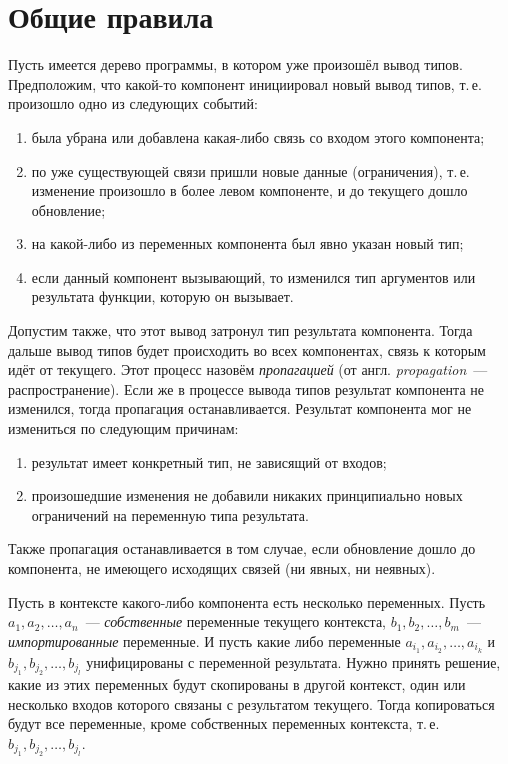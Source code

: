 \section{Общие правила}
Пусть имеется дерево программы, в котором уже произошёл вывод типов. Предположим, что какой-то компонент инициировал новый вывод типов, т.\,е. произошло одно из следующих событий:
\begin{enumerate}[1)]
	\item была убрана или добавлена какая-либо связь со входом этого компонента;
	\item по уже существующей связи пришли новые данные (ограничения), т.\,е. изменение произошло в более левом компоненте, и до текущего дошло обновление;
	\item на какой-либо из переменных компонента был явно указан новый тип;
	\item если данный компонент вызывающий, то изменился тип аргументов или результата функции, которую он вызывает.
\end{enumerate}
Допустим также, что этот вывод затронул тип результата компонента. Тогда дальше вывод типов будет происходить во всех компонентах, связь к которым идёт от текущего. Этот процесс назовём \textit{пропагацией} (от англ. \textit{propagation}~--- распространение). Если же в процессе вывода типов результат компонента не изменился, тогда пропагация останавливается. Результат компонента мог не измениться по следующим причинам:
\begin{enumerate}[1)]
	\item результат имеет конкретный тип, не зависящий от входов;
	\item произошедшие изменения не добавили никаких принципиально новых ограничений на переменную типа результата.
\end{enumerate}
Также пропагация останавливается в том случае, если обновление дошло до компонента, не имеющего исходящих связей (ни явных, ни неявных).

Пусть в контексте какого-либо компонента есть несколько переменных. Пусть $a_1, a_2, \ldots, a_n$~--- \textit{собственные} переменные текущего контекста, $b_1, b_2, \ldots, b_m$~--- \textit{импортированные} переменные. И пусть какие либо переменные $a_{i_1}, a_{i_2}, \ldots, a_{i_k}$ и $b_{j_1}, b_{j_2}, \ldots, b_{j_l}$ унифицированы с переменной результата. Нужно принять решение, какие из этих переменных будут скопированы в другой контекст, один или несколько входов которого связаны с результатом текущего. Тогда копироваться будут все переменные, кроме собственных переменных контекста, т.\,е. $b_{j_1}, b_{j_2}, \ldots, b_{j_l}$.


